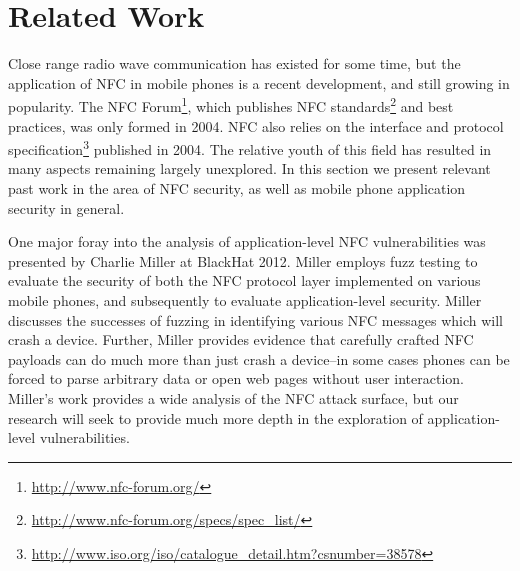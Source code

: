 \documentclass[12pt]{article}
\begin{document}
\section{Related Work}
Close range radio wave communication has existed for some time, but the application of NFC in mobile phones is a recent development, and still growing in popularity.
The NFC Forum\footnote{\url{http://www.nfc-forum.org/}}, which publishes NFC standards\footnote{\url{http://www.nfc-forum.org/specs/spec_list/}} and best practices, was only formed in 2004.
NFC also relies on the interface and protocol specification\footnote{\url{http://www.iso.org/iso/catalogue_detail.htm?csnumber=38578}} published in 2004.
The relative youth of this field has resulted in many aspects remaining largely unexplored.
In this section we present relevant past work in the area of NFC security, as well as mobile phone application security in general.

One major foray into the analysis of application-level NFC vulnerabilities was presented by Charlie Miller at BlackHat 2012\cite{miller2012}.
Miller employs fuzz testing to evaluate the security of both the NFC protocol layer implemented on various mobile phones, and subsequently to evaluate application-level security.
Miller discusses the successes of fuzzing in identifying various NFC messages which will crash a device.
Further, Miller provides evidence that carefully crafted NFC payloads can do much more than just crash a device--in some cases phones can be forced to parse arbitrary data or open web pages without user interaction.
Miller's work provides a wide analysis of the NFC attack surface, but our research will seek to provide much more depth in the exploration of application-level vulnerabilities.
\end{document}
